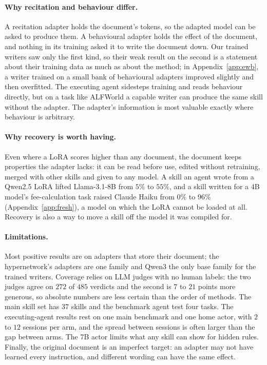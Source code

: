\documentclass[11pt]{article}
\begin{document}
\paragraph{Why recitation and behaviour differ.} A recitation adapter holds the document's tokens, so the adapted model can be asked to produce
them. A behavioural adapter holds the effect of the document, and nothing in its training asked it to write the document down. Our trained writers
saw only the first kind, so their weak result on the second is a statement about their training data as much as about the method; in Appendix~\ref{app:ewb}, a writer trained on a small bank of behavioural adapters improved slightly and then overfitted. The executing agent sidesteps training and
reads behaviour directly, but on a task like ALFWorld a capable writer can produce the same skill without the adapter. The adapter's information is
most valuable exactly where behaviour is arbitrary.

\paragraph{Why recovery is worth having.} Even where a LoRA scores higher than any document, the document keeps properties the adapter lacks: it can be
read before use, edited without retraining, merged with other skills and given to any model. A skill an agent wrote from a Qwen2.5 LoRA lifted Llama-3.1-8B
from $5\%$ to $55\%$, and a skill written for a 4B model's fee-calculation task raised Claude Haiku from $0\%$ to $96\%$ (Appendix~\ref{app:fresh}), a model on which the LoRA cannot be loaded at all. Recovery is also a way to move a skill off the model it was compiled for.

\paragraph{Limitations.} Most positive results are on adapters that store their document; the hypernetwork's adapters are one family and Qwen3 the
only base family for the trained writers. Coverage relies on LLM judges with no human labels: the two judges agree on $272$ of $485$ verdicts and the
second is $7$ to $21$ points more generous, so absolute numbers are less certain than the order of methods. The main skill set has $37$ skills and the
benchmark agent test four tasks. The executing-agent results rest on one main benchmark and one home actor, with $2$ to $12$ sessions per arm, and
the spread between sessions is often larger than the gap between arms. The 7B actor limits what any skill can show for hidden rules. Finally, the original
document is an imperfect target: an adapter may not have learned every instruction, and different wording can have the same effect.
\end{document}
